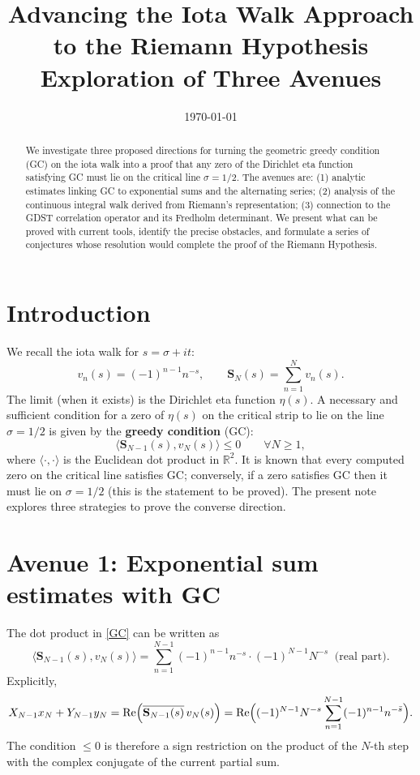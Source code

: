 \documentclass[11pt,a4paper]{article}
\title{\bf Advancing the Iota Walk Approach to the Riemann Hypothesis\\
Exploration of Three Avenues}
\author{}
\date{\today}
\newcommand{\R}{\mathbb{R}}
\newcommand{\RE}{\operatorname{Re}}
\begin{document}
\maketitle

\begin{abstract}
We investigate three proposed directions for turning the geometric greedy condition (GC) on the iota walk into a proof that any zero of the Dirichlet eta function satisfying GC must lie on the critical line $\sigma = 1/2$.  The avenues are: (1) analytic estimates linking GC to exponential sums and the alternating series; (2) analysis of the continuous integral walk derived from Riemann's representation; (3) connection to the GDST correlation operator and its Fredholm determinant.  We present what can be proved with current tools, identify the precise obstacles, and formulate a series of conjectures whose resolution would complete the proof of the Riemann Hypothesis.
\end{abstract}

\section{Introduction}
We recall the iota walk for $s = \sigma + it$:
\[
v_n(s) = (-1)^{n-1} n^{-s},\qquad 
\mathbf{S}_N(s) = \sum_{n=1}^{N} v_n(s).
\]
The limit (when it exists) is the Dirichlet eta function $\eta(s)$.  A necessary and sufficient condition for a zero of $\eta(s)$ on the critical strip to lie on the line $\sigma = 1/2$ is given by the \textbf{greedy condition} (GC):
\begin{equation}\label{GC}
\langle\mathbf{S}_{N-1}(s), v_N(s)\rangle \le 0 \qquad \forall N \ge 1,
\end{equation}
where $\langle\cdot,\cdot\rangle$ is the Euclidean dot product in $\R^2$.  It is known that every computed zero on the critical line satisfies GC; conversely, if a zero satisfies GC then it must lie on $\sigma = 1/2$ (this is the statement to be proved).  The present note explores three strategies to prove the converse direction.

\section{Avenue 1: Exponential sum estimates with GC}
\label{sec:exp}

The dot product in \eqref{GC} can be written as
\[
\langle\mathbf{S}_{N-1}(s), v_N(s)\rangle
= \sum_{n=1}^{N-1} (-1)^{n-1} n^{-s} \cdot (-1)^{N-1} N^{-s} \;\; \text{(real part)}.
\]
Explicitly,
\[
X_{N-1} x_N + Y_{N-1} y_N
= \RE \Bigl( \overline{\mathbf{S}_{N-1}(s)}\, v_N(s) \Bigr)
= \RE \Bigl( (-1)^{N-1} N^{-s} \sum_{n=1}^{N-1} (-1)^{n-1} n^{-\bar s} \Bigr).
\]
The condition $\le 0$ is therefore a sign restriction on the product of the $N$-th step with the complex conjugate of the current partial sum.
\end{document}
